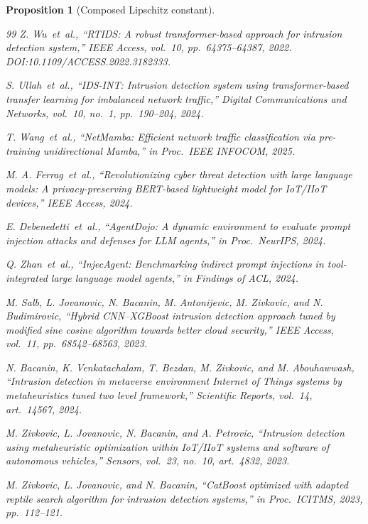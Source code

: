 \documentclass{ieeeaccess}
\newtheorem{proposition}[theorem]{Proposition}
\begin{document}
\begin{proposition}[Composed Lipschitz constant]
\begin{thebibliography}{99}
 Z. Wu~\textit{et~al.}, ``RTIDS: A robust transformer-based approach for intrusion detection system,'' \textit{IEEE Access}, vol.~10, pp.~64375--64387, 2022. DOI:10.1109/ACCESS.2022.3182333.

 S. Ullah~\textit{et~al.}, ``IDS-INT: Intrusion detection system using transformer-based transfer learning for imbalanced network traffic,'' \textit{Digital Communications and Networks}, vol.~10, no.~1, pp.~190--204, 2024.

 T. Wang~\textit{et~al.}, ``NetMamba: Efficient network traffic classification via pre-training unidirectional Mamba,'' in \textit{Proc.\ IEEE INFOCOM}, 2025.

 M. A. Ferrag~\textit{et~al.}, ``Revolutionizing cyber threat detection with large language models: A privacy-preserving BERT-based lightweight model for IoT/IIoT devices,'' \textit{IEEE Access}, 2024.

 E. Debenedetti~\textit{et~al.}, ``AgentDojo: A dynamic environment to evaluate prompt injection attacks and defenses for LLM agents,'' in \textit{Proc.\ NeurIPS}, 2024.

 Q. Zhan~\textit{et~al.}, ``InjecAgent: Benchmarking indirect prompt injections in tool-integrated large language model agents,'' in \textit{Findings of ACL}, 2024.

 M. Salb, L. Jovanovic, N. Bacanin, M. Antonijevic, M. Zivkovic, and N. Budimirovic, ``Hybrid CNN--XGBoost intrusion detection approach tuned by modified sine cosine algorithm towards better cloud security,'' \textit{IEEE Access}, vol.~11, pp.~68542--68563, 2023.

 N. Bacanin, K. Venkatachalam, T. Bezdan, M. Zivkovic, and M. Abouhawwash, ``Intrusion detection in metaverse environment Internet of Things systems by metaheuristics tuned two level framework,'' \textit{Scientific Reports}, vol.~14, art.~14567, 2024.

 M. Zivkovic, L. Jovanovic, N. Bacanin, and A. Petrovic, ``Intrusion detection using metaheuristic optimization within IoT/IIoT systems and software of autonomous vehicles,'' \textit{Sensors}, vol.~23, no.~10, art.~4832, 2023.

 M. Zivkovic, L. Jovanovic, and N. Bacanin, ``CatBoost optimized with adapted reptile search algorithm for intrusion detection systems,'' in \textit{Proc.\ ICITMS}, 2023, pp.~112--121.


\end{thebibliography}
\end{proposition}
\end{document}
